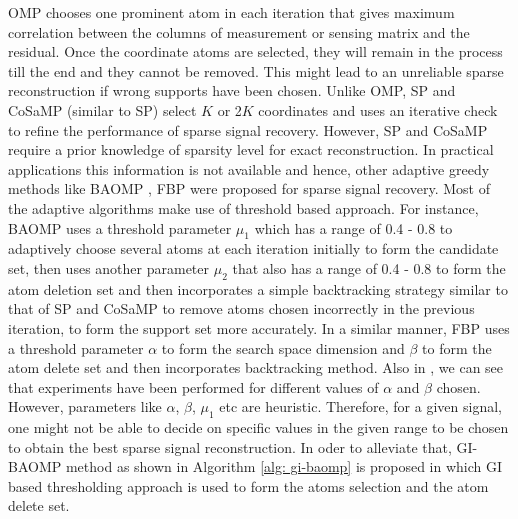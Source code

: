 \documentclass[11pt,conference]{IEEEtran}
\begin{document}
\par OMP \cite{omp} chooses one prominent atom in each iteration that gives maximum correlation between the columns of measurement or sensing matrix and the residual. Once the coordinate atoms are selected, they will remain in the process till the end and they cannot be removed. This might lead to an unreliable sparse reconstruction if wrong supports have been chosen. Unlike OMP, SP \cite{sp} and CoSaMP (similar to SP) \cite{cosamp} select $K$ or 2$K$ coordinates and uses an iterative check to refine the performance of sparse signal recovery. However, SP and CoSaMP require a prior knowledge of sparsity level for exact reconstruction. In practical applications this information is not available and hence, other adaptive greedy methods like BAOMP \cite{baomp}, FBP \cite{fbp} were proposed for sparse signal recovery. Most of the adaptive algorithms make use of threshold based approach. For instance, BAOMP uses a threshold parameter $\mu_1$ which has a range of 0.4 - 0.8 to adaptively choose several atoms at each 
iteration initially to form the candidate set, then uses another parameter $\mu_2$ that also has a range of 0.4 - 0.8 to form the atom deletion set and then incorporates a simple backtracking strategy similar 
to that of SP and CoSaMP to remove atoms chosen incorrectly in the previous iteration, to form the support set more accurately. In a similar manner, FBP uses a threshold parameter $\alpha$ to form the search space dimension and $\beta$ to form the atom delete set and then incorporates backtracking method. Also in \cite{fbp}, we can see that experiments have been performed for different values of $\alpha$ and $\beta$ chosen. However, parameters like $\alpha$, $\beta$, $\mu_1$ etc are heuristic. Therefore, for a given signal, one might not be able to decide on specific values in the given range to be chosen to obtain the best sparse signal reconstruction. In oder to alleviate that, GI-BAOMP method as shown in Algorithm \ref{alg: gi-baomp} is proposed in which GI \cite{GI} based thresholding approach is used to form the atoms selection and the atom delete set.
\end{document}
